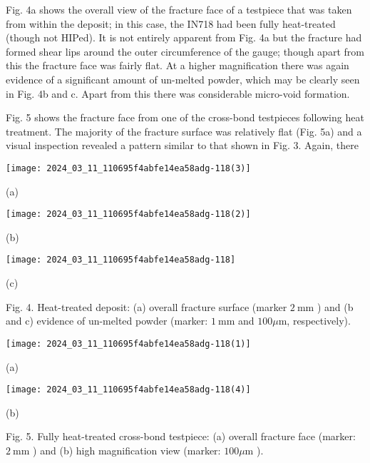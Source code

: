 \documentclass[10pt]{article}
\begin{document}
Fig. 4a shows the overall view of the fracture face of a testpiece that was taken from within the deposit; in this case, the IN718 had been fully heat-treated (though not HIPed). It is not entirely apparent from Fig. 4a but the fracture had formed shear lips around the outer circumference of the gauge; though apart from this the fracture face was fairly flat. At a higher magnification there was again evidence of a significant amount of un-melted powder, which may be clearly seen in Fig. 4b and c. Apart from this there was considerable micro-void formation.

Fig. 5 shows the fracture face from one of the cross-bond testpieces following heat treatment. The majority of the fracture surface was relatively flat (Fig. 5a) and a visual inspection revealed a pattern similar to that shown in Fig. 3. Again, there

\begin{center}
\texttt{[image: 2024\_03\_11\_110695f4abfe14ea58adg-118(3)]}
\end{center}

(a)

\begin{center}
\texttt{[image: 2024\_03\_11\_110695f4abfe14ea58adg-118(2)]}
\end{center}

(b)

\begin{center}
\texttt{[image: 2024\_03\_11\_110695f4abfe14ea58adg-118]}
\end{center}

(c)

Fig. 4. Heat-treated deposit: (a) overall fracture surface (marker $2 \mathrm{~mm}$ ) and (b and c) evidence of un-melted powder (marker: $1 \mathrm{~mm}$ and $100 \mu \mathrm{m}$, respectively).

\begin{center}
\texttt{[image: 2024\_03\_11\_110695f4abfe14ea58adg-118(1)]}
\end{center}

(a)

\begin{center}
\texttt{[image: 2024\_03\_11\_110695f4abfe14ea58adg-118(4)]}
\end{center}

(b)

Fig. 5. Fully heat-treated cross-bond testpiece: (a) overall fracture face (marker: $2 \mathrm{~mm}$ ) and (b) high magnification view (marker: $100 \mu \mathrm{m}$ ).
\end{document}
